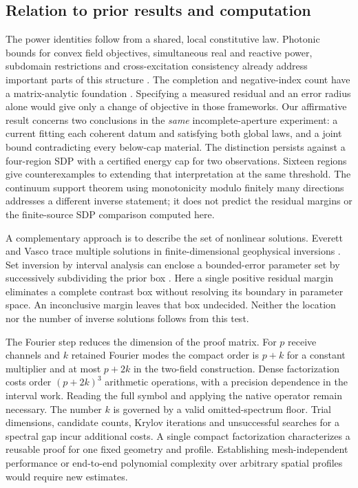 \documentclass[anonymous,12pt]{iopjournal}
\theoremstyle{remark}\newtheorem{remark}[theorem]{Remark}
\numberwithin{equation}{section}
\begin{document}
\subsection{Relation to prior results and computation}
The power identities follow from a shared, local constitutive law. Photonic bounds for convex field objectives, simultaneous real and reactive power, subdomain restrictions and cross-excitation consistency already address important parts of this structure \cite{trivedi,moleskyglobal,moleskylocal,shim}. The completion and negative-index count have a matrix-analytic foundation \cite{tian}. Specifying a measured residual and an error radius alone would give only a change of objective in those frameworks. Our affirmative result concerns two conclusions in the \emph{same} incomplete-aperture experiment: a current fitting each coherent datum and satisfying both global laws, and a joint bound contradicting every below-cap material. The distinction persists against a four-region SDP with a certified energy cap for two observations. Sixteen regions give counterexamples to extending that interpretation at the same threshold. The continuum support theorem using monotonicity modulo finitely many directions \cite{albicker} addresses a different inverse statement; it does not predict the residual margins or the finite-source SDP comparison computed here.

A complementary approach is to describe the set of nonlinear solutions. Everett and Vasco trace multiple solutions in finite-dimensional geophysical inversions \cite{everett96,vasco,everett26}. Set inversion by interval analysis can enclose a bounded-error parameter set by successively subdividing the prior box \cite{sivia}. Here a single positive residual margin eliminates a complete contrast box without resolving its boundary in parameter space. An inconclusive margin leaves that box undecided. Neither the location nor the number of inverse solutions follows from this test.

The Fourier step reduces the dimension of the proof matrix. For $p$ receive channels and $k$ retained Fourier modes the compact order is $p+k$ for a constant multiplier and at most $p+2k$ in the two-field construction. Dense factorization costs order $(p+2k)^3$ arithmetic operations, with a precision dependence in the interval work. Reading the full symbol and applying the native operator remain necessary. The number $k$ is governed by a valid omitted-spectrum floor. Trial dimensions, candidate counts, Krylov iterations and unsuccessful searches for a spectral gap incur additional costs. A single compact factorization characterizes a reusable proof for one fixed geometry and profile. Establishing mesh-independent performance or end-to-end polynomial complexity over arbitrary spatial profiles would require new estimates.
\end{document}
